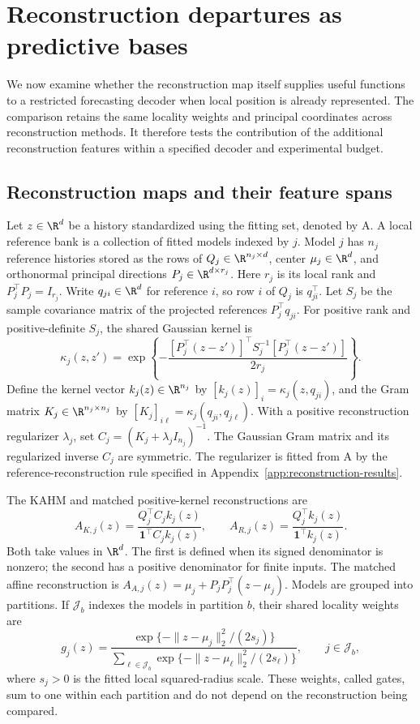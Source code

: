 \section{Reconstruction departures as predictive bases}
\label{sec:reconstruction-mechanism}

We now examine whether the reconstruction map itself supplies useful
functions to a restricted forecasting decoder when local position is
already represented. The comparison retains the same locality weights
and principal coordinates across reconstruction methods. It therefore
tests the contribution of the additional reconstruction features within
a specified decoder and experimental budget.

\subsection{Reconstruction maps and their feature spans}

Let $z\in\R^d$ be a history standardized using the fitting set, denoted
by A. A local reference bank is a collection of fitted models indexed by
$j$. Model $j$ has $n_j$ reference histories stored as the rows of
$Q_j\in\R^{n_j\times d}$, center $\mu_j\in\R^d$, and orthonormal
principal directions $P_j\in\R^{d\times r_j}$. Here $r_j$ is its local
rank and $P_j^\top P_j=I_{r_j}$. Write $q_{ji}\in\R^d$ for reference
$i$, so row $i$ of $Q_j$ is $q_{ji}^\top$. Let $S_j$ be the sample
covariance matrix of the projected references $P_j^\top q_{ji}$. For
positive rank and positive-definite $S_j$, the shared Gaussian kernel is
\[
 \kappa_j(z,z')=\exp\!\left\{
 -\frac{[P_j^\top(z-z')]^\top S_j^{-1}[P_j^\top(z-z')]}{2r_j}
 \right\}.
\]
Define the kernel vector $k_j(z)\in\R^{n_j}$ by
$[k_j(z)]_i=\kappa_j(z,q_{ji})$, and the Gram matrix
$K_j\in\R^{n_j\times n_j}$ by
$[K_j]_{i\ell}=\kappa_j(q_{ji},q_{j\ell})$.
With a positive reconstruction regularizer $\lambda_j$, set
$C_j=(K_j+\lambda_j I_{n_j})^{-1}$. The Gaussian Gram matrix and its
regularized inverse $C_j$ are symmetric. The regularizer is fitted from A
by the reference-reconstruction rule specified in
Appendix~\ref{app:reconstruction-results}.

The KAHM and matched positive-kernel reconstructions are
\begin{equation}
 A_{K,j}(z)=\frac{Q_j^\top C_j k_j(z)}
 {\mathbf1^\top C_j k_j(z)},\qquad
 A_{R,j}(z)=\frac{Q_j^\top k_j(z)}{\mathbf1^\top k_j(z)}.
 \label{eq:mechanism-main-maps}
\end{equation}
Both take values in $\R^d$. The first is defined when its signed
denominator is nonzero; the second has a positive denominator for finite
inputs. The matched affine reconstruction is
$A_{A,j}(z)=\mu_j+P_jP_j^\top(z-\mu_j)$.
Models are grouped into partitions. If $\mathcal J_b$ indexes the models
in partition $b$, their shared locality weights are
\[
 g_j(z)=\frac{\exp\{-\|z-\mu_j\|_2^2/(2s_j)\}}
 {\sum_{\ell\in\mathcal J_b}
       \exp\{-\|z-\mu_\ell\|_2^2/(2s_\ell)\}},
 \qquad j\in\mathcal J_b,
\]
where $s_j>0$ is the fitted local squared-radius scale. These weights,
called gates, sum to one within each partition and do not depend on the
reconstruction being compared.

